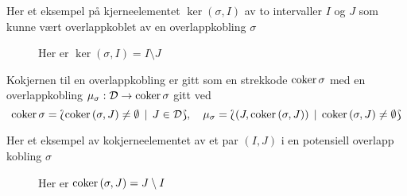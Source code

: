 Her et eksempel på kjerneelementet $\ker(\sigma,I)$ av to
intervaller $I$ og $J$ som kunne vært overlappkoblet av en
overlappkobling $\sigma$

\begin{figure}[h]
  \centering
  \scalebox{0.5}{
  
}
  \caption{Her er $\ker(\sigma,I)=I\setminus J$}
  \label{fig:barcker}
\end{figure}

\begin{teorem}\label{trm:coker}
  Kokjernen til en overlappkobling er gitt som en
  strekkode $\textnormal{coker}\,\sigma$ med en overlappkobling
  $\mu_\sigma:\mathcal{D}\to\textnormal{coker}\,\sigma$ gitt ved
  \[\textnormal{coker}\,\sigma
  = \Lbag \textnormal{coker}\,(\sigma,J)\neq\emptyset\,\mid\, J\in\mathcal{D}\Rbag,\quad
  \mu_\sigma = \Lbag (J,\textnormal{coker}\,(\sigma,J))\,\mid\, \textnormal{coker}\,(\sigma,J)\neq\emptyset\Rbag\]
\end{teorem}

Her et eksempel av kokjerneelementet av et par $(I,J)$
i en potensiell overlapp kobling $\sigma$
\begin{figure}[h]
  \centering
  \scalebox{0.5}{
  
}
  \caption{Her er $\textnormal{coker}\,(\sigma,J)=J\setminus I$}
  \label{fig:barccoker}
\end{figure}

